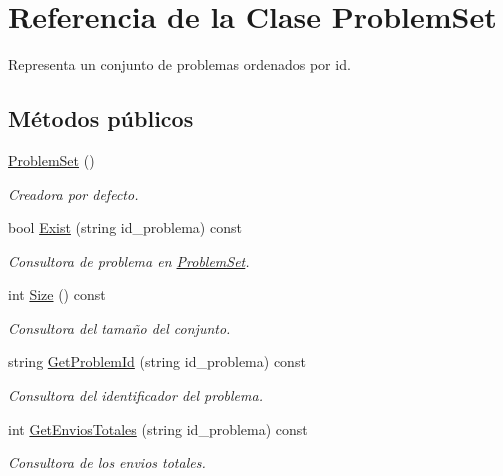 \hypertarget{class_problem_set}{}\section{Referencia de la Clase Problem\+Set}
\label{class_problem_set}


Representa un conjunto de problemas ordenados por id.  


\subsection*{Métodos públicos}
\begin{DoxyCompactItemize}
\item 
\mbox{\hyperlink{class_problem_set_a3eadb6c62386acf9948b95bb6d05b5ae}{Problem\+Set}} ()
\begin{DoxyCompactList}\small\item\em Creadora por defecto. \end{DoxyCompactList}\item 
bool \mbox{\hyperlink{class_problem_set_a51774196cd2b29bfc0e0adcca8dd325d}{Exist}} (string id\+\_\+problema) const
\begin{DoxyCompactList}\small\item\em Consultora de problema en \mbox{\hyperlink{class_problem_set}{Problem\+Set}}. \end{DoxyCompactList}\item 
int \mbox{\hyperlink{class_problem_set_ac173526274dc6d5f88623c3dd2630cd6}{Size}} () const
\begin{DoxyCompactList}\small\item\em Consultora del tamaño del conjunto. \end{DoxyCompactList}\item 
string \mbox{\hyperlink{class_problem_set_a8fd763c7dbee07a8f0101119f23e694a}{Get\+Problem\+Id}} (string id\+\_\+problema) const
\begin{DoxyCompactList}\small\item\em Consultora del identificador del problema. \end{DoxyCompactList}\item 
int \mbox{\hyperlink{class_problem_set_a33746a7a5aefdce5a4e8a5bf597c84f1}{Get\+Envios\+Totales}} (string id\+\_\+problema) const
\begin{DoxyCompactList}\small\item\em Consultora de los envios totales. \end{DoxyCompactList}\item 

\end{DoxyCompactItemize}
